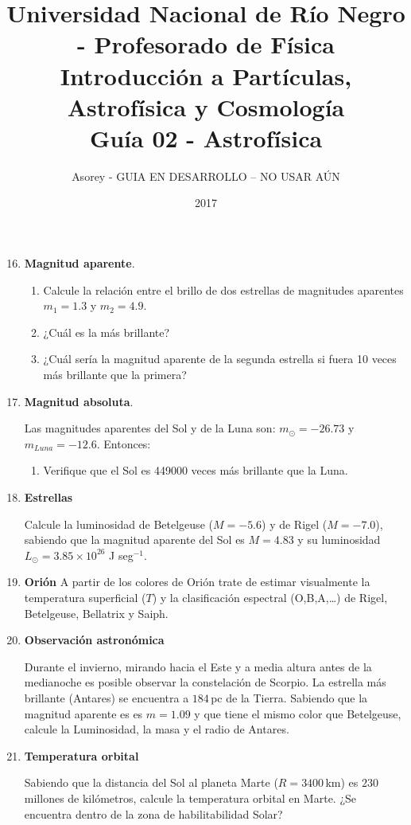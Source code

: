 \documentclass[a4paper,12pt]{article}
\begin{document}
\title{
{\normalsize{Universidad Nacional de Río Negro - Profesorado de Física}}\\
Introducción a Partículas, Astrofísica y Cosmología \\ Guía 02 - Astrofísica\\}
\author{Asorey - GUIA EN DESARROLLO -- NO USAR AÚN}
\date{2017}
\maketitle

\begin{enumerate}
	\setcounter{enumi}{15}      %
  \item{\bf{Magnitud aparente}}.

    \begin{enumerate}
      \item Calcule la relación entre el brillo de dos estrellas de magnitudes aparentes $m_1=1.3$ y $m_2=4.9$.
      \item ¿Cuál es la más brillante?
      \item ¿Cuál sería la magnitud aparente de la segunda estrella si fuera 10 veces más brillante que la primera?
    \end{enumerate}

  \item{\bf{Magnitud absoluta}}.

    Las magnitudes aparentes del Sol y de la Luna son: $m_\odot=-26.73$ y $m_{Luna}=-12.6$. Entonces:
    \begin{enumerate}
      \item Verifique que el Sol es 449000 veces más brillante que la Luna.
    \end{enumerate}

  \item{\bf{Estrellas}}

    Calcule la luminosidad de Betelgeuse ($M=-5.6$) y de Rigel ($M=-7.0$),
    sabiendo que la magnitud aparente del Sol es $M=4.83$ y su luminosidad
    $L_\odot = 3.85\times10^{26}$ J seg$^{-1}$.

  \item{\bf{Orión}}
    A partir de los colores de Orión trate de estimar
    visualmente la temperatura superficial ($T$) y la clasificación espectral
    (O,B,A,\ldots) de Rigel, Betelgeuse, Bellatrix y Saiph.

  \item{\bf{Observación astronómica}}

    Durante el invierno, mirando hacia el Este y a media altura antes de la
    medianoche es posible observar la constelación de Scorpio. La estrella más
    brillante (Antares) se encuentra a $184$\,pc de la Tierra. Sabiendo que
    la magnitud aparente es es $m=1.09$ y que tiene el mismo color que
    Betelgeuse, calcule la Luminosidad, la masa y el radio de Antares.

  \item{\bf{Temperatura orbital}}

    Sabiendo que la distancia del Sol al planeta Marte ($R=3400$\,km) es $230$
    millones de kilómetros, calcule la temperatura orbital en Marte. ¿Se
    encuentra dentro de la zona de habilitabilidad Solar?
\end{enumerate}
\end{document}
